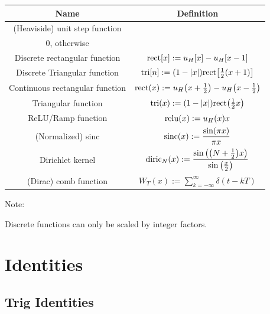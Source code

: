 \documentclass[11pt]{article}
\begin{document}
  \bgroup
  \renewcommand{\arraystretch}{2.4}
  \setlength{\tabcolsep}{0.8cm}
  \large\begin{tabular}{c|c}
    Name & Definition \\
    \hline
    (Heaviside) unit step function &
      \(u_{H}(t) := \begin{cases} 1 \textrm{ if }  x > 0  \\ 0, \textrm{ otherwise}  \end{cases}\) \\
    Discrete rectangular function & \(\mathrm{rect}[x] := u_{H}[x] - u_{H}[x - 1]\) \\
    Discrete Triangular function & \(\mathrm{tri}[n] :=
    (1 - |x|)\mathrm{rect}{\left[ \frac{1}{2}(x + 1) \right]}\) \\
    Continuous rectangular function & \(\mathrm{rect}(x) := u_H{\left( x + \frac{1}{2} \right)} - u_H{\left( x - \frac{1}{2} \right)}\) \\
    Triangular function & \(\mathrm{tri}(x) :=
    (1 - |x|)\mathrm{rect}{\left( \frac{1}{2}x \right)}\) \\
    ReLU/Ramp function & \(\mathrm{relu}(x) := u_H(x)x\) \\
    (Normalized) sinc & \(\mathrm{sinc}(x) := \dfrac{\sin(\pi x)}{\pi x}\) \\
    Dirichlet kernel & \(\mathrm{diric}_N(x) := \dfrac{\sin{\left( {\left( N + \frac{1}{2} \right)}x \right)}}{\sin{\left( \frac{x}{2} \right)}}\) \\
    (Dirac) comb function & \(W_T(x) := \displaystyle \sum_{k = -\infty}^\infty \delta(t - kT)\) \\
  \end{tabular}
  \egroup

  \vspace{12pt}

  Note:

  Discrete functions can only be scaled by integer factors.

  \pagebreak

  \section{Identities}

  \subsection{Trig Identities}
\end{document}
